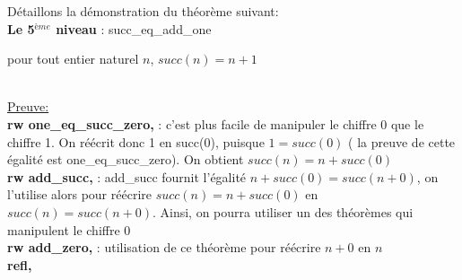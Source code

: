 \documentclass{article}
\begin{document}
Détaillons la démonstration du théorème suivant:\\
\textbf{Le 5$^{ème}$ niveau} : succ\_eq\_add\_one \begin{center}  pour tout entier naturel $n$,  $succ(n)=n+1$ \end{center}\\
{\large\underline{Preuve:}} \\
\textbf{rw one\_eq\_succ\_zero,} : c'est plus facile de manipuler le chiffre 0 que le chiffre 1. On réécrit donc 1 en succ(0), puisque $1=succ(0)$ ( la preuve de cette égalité est one\_eq\_succ\_zero). On obtient $succ(n)=n+succ(0)$\\
 \textbf{rw add\_succ,} : add\_succ fournit l'égalité $n+succ(0)=succ(n+0)$, on l'utilise alors pour réécrire $succ(n)=n+succ(0)$ en $succ(n)=succ(n+0)$. Ainsi, on pourra utiliser un des théorèmes qui manipulent le chiffre 0\\
\textbf{rw add\_zero,} : utilisation de ce théorème pour réécrire $n+0$ en $n$\\
\textbf{refl,}
\end{document}
